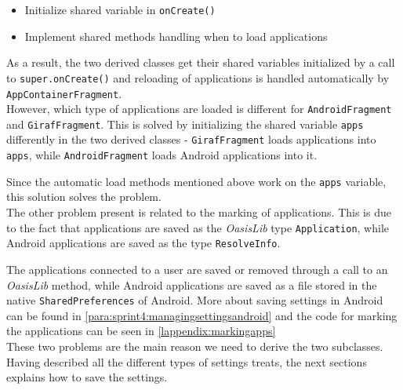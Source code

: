 \begin{itemize}
\item Initialize shared variable in \lstinline!onCreate()!
\item Implement shared methods handling when to load applications
\end{itemize}

As a result, the two derived classes get their shared variables initialized by a call to \lstinline!super.onCreate()! and reloading of applications is handled automatically by \lstinline!AppContainerFragment!. \\

However, which type of applications are loaded is different for \lstinline!AndroidFragment! and \lstinline!GirafFragment!.
This is solved by initializing the shared variable \lstinline!apps! differently in the two derived classes -
\lstinline!GirafFragment! loads \giraf applications into \lstinline!apps!, while \lstinline!AndroidFragment! loads Android applications into it.

Since the automatic load methods mentioned above work on the \lstinline!apps! variable, this solution solves the problem. \\

The other problem present is related to the marking of applications.
This is due to the fact that \giraf applications are saved as the \textit{OasisLib} type \lstinline!Application!, while Android applications are saved as the type \lstinline!ResolveInfo!.

The \giraf applications connected to a user are saved or removed through a call to an \textit{OasisLib} method, while Android applications are saved as a file stored in the native \lstinline!SharedPreferences! of Android.
More about saving settings in Android can be found in \cref{para:sprint4:managingsettingsandroid} and the code for marking the applications can be seen in \cref{lappendix:markingapps}\\


These two problems are the main reason we need to derive the two subclasses.\\

Having described all the different types of settings \launcher treats, the next sections explains how to save the settings.